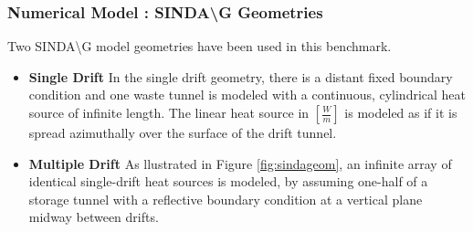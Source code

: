 \begin{frame}[ctb!]
  \frametitle{Numerical Model : SINDA{\textbackslash}G Geometries}

Two SINDA{\textbackslash}G model geometries have been used in this benchmark.  
\begin{itemize}
  \item{\textbf{Single Drift}} In the single drift geometry, there is a distant fixed boundary condition and one waste tunnel is modeled with a continuous, cylindrical heat source of infinite length. The linear heat source in $[\frac{W}{m}]$ is modeled as if it is spread azimuthally over the surface of the drift tunnel.  
  \item{\textbf{Multiple Drift}} As llustrated in Figure \ref{fig:sindageom}, an infinite array of identical single-drift heat sources is modeled, by assuming one-half of a storage tunnel with a reflective boundary condition at a vertical plane midway between drifts. 
\end{itemize}
\end{frame}
